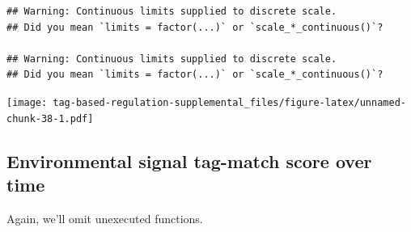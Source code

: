 \documentclass[]{book}
\begin{document}
\begin{verbatim}
## Warning: Continuous limits supplied to discrete scale.
## Did you mean `limits = factor(...)` or `scale_*_continuous()`?

## Warning: Continuous limits supplied to discrete scale.
## Did you mean `limits = factor(...)` or `scale_*_continuous()`?
\end{verbatim}

\texttt{[image: tag-based-regulation-supplemental\_files/figure-latex/unnamed-chunk-38-1.pdf]}

\hypertarget{environmental-signal-tag-match-score-over-time}{%
\subsection{Environmental signal tag-match score over time}\label{environmental-signal-tag-match-score-over-time}}

Again, we'll omit unexecuted functions.
\end{document}
